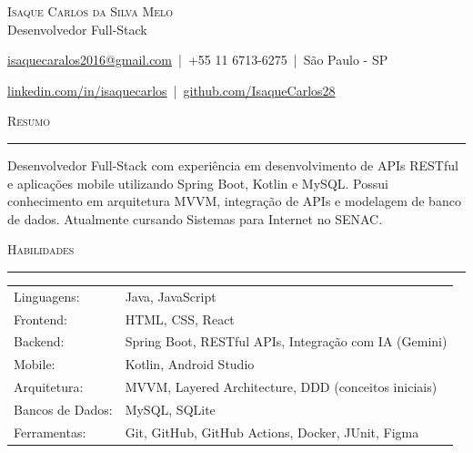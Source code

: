\documentclass[a4paper]{article}
\newcommand{\header}[1]{ \vspace{4mm} {\large\textsc{#1}} \vspace{1mm} \hrule \vspace{2mm} }
\begin{document}

\begin{center}
    {\Huge \scshape Isaque Carlos da Silva Melo}\\
    \vspace{4pt}
    {\Large Desenvolvedor Full-Stack}
\end{center}

\vspace{1mm}

\href{mailto:isaquecaralos2016@gmail.com}{isaquecaralos2016@gmail.com}
\,|\, 
+55 11 6713-6275
\,|\, 
São Paulo - SP

\vspace{0.5mm}

\href{https://linkedin.com/in/isaquecarlos}{linkedin.com/in/isaquecarlos}
\,|\, 
\href{https://github.com/IsaqueCarlos28}{github.com/IsaqueCarlos28}


\header{Resumo}

Desenvolvedor Full-Stack com experiência em desenvolvimento de APIs RESTful e aplicações mobile utilizando Spring Boot, Kotlin e MySQL. Possui conhecimento em arquitetura MVVM, integração de APIs e modelagem de banco de dados. Atualmente cursando Sistemas para Internet no SENAC.



\header{Habilidades}

\begin{tabular}{p{4cm} p{11cm}}

Linguagens: & Java, JavaScript \\

Frontend: & HTML, CSS, React \\

Backend: & Spring Boot, RESTful APIs, Integração com IA (Gemini) \\

Mobile: & Kotlin, Android Studio \\

Arquitetura:& MVVM, Layered Architecture, DDD (conceitos iniciais) \\

Bancos de Dados: & MySQL, SQLite \\

Ferramentas: & Git, GitHub, GitHub Actions, Docker, JUnit, Figma \\

\end{tabular}
\end{document}
